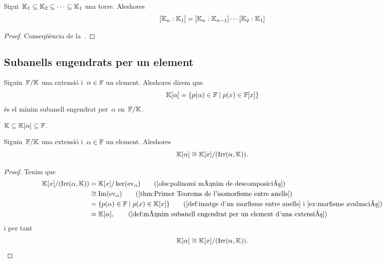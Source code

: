 \documentclass[../../main.tex]{subfiles}
\begin{document}
    \begin{corollary}
        \label{cor:fórmula de les torres}
        Sigui~\(\mathbb{K}_{1}\subseteq\mathbb{K}_{2}\subseteq\dots\subseteq\mathbb{K}_{1}\) una torre.
        Aleshores
        \[
            [\mathbb{K}_{n}:\mathbb{K}_{1}]=[\mathbb{K}_{n}:\mathbb{K}_{n-1}]\cdots[\mathbb{K}_{2}:\mathbb{K}_{1}]
        \]
    \end{corollary}
    \begin{proof}
        Conseqüència de la~.
    \end{proof}
\subsection{Subanells engendrats per un element}
    \begin{definition}
        \label{def:mínim subanell engendrat per un element d'una extensió}
        Siguin~\(\mathbb{F}/\mathbb{K}\) una extensió i~\(\alpha\in\mathbb{F}\) un element.
        Aleshores direm que
        \[
            \mathbb{K}[\alpha]=\{p(\alpha)\in\mathbb{F}\mid p(x)\in\mathbb{F}[x]\}
        \]
        és el mínim subanell engendrat per~\(\alpha\) en~\(\mathbb{F}/\mathbb{K}\).
    \end{definition}
    \begin{observation}
    \label{obs:l'anell engendrat per alpha està entre l'extensió}
        \(\mathbb{K}\subseteq\mathbb{K}[\alpha]\subseteq\mathbb{F}\).
    \end{observation}
    \begin{proposition}
        \label{prop:el mínim subanell engendrat per un element és l'anell de polinomis quocient l'irreductible de l'element}
        Siguin~\(\mathbb{F}/\mathbb{K}\) una extensió i~\(\alpha\in\mathbb{F}\) un element.
        Aleshores
        \[
            \mathbb{K}[\alpha]\cong\mathbb{K}[x]/(\operatorname{Irr}(\alpha,\mathbb{K})).
        \]
    \end{proposition}
    \begin{proof}
        Tenim que
        \begin{align*}
            \KK[x]/(\Irr(\alpha,\KK))&=\KK[x]/\ker(\ev_{\alpha}) \tag{\ref{obs:polinomi mínim de descomposició}}\\
            &\cong\Ima(\ev_{\alpha}) \tag{\ref{thm:Primer Teorema de l'isomorfisme entre anells}}\\
            &=\{p(\alpha)\in\FF\mid p(x)\in\KK[x]\} \tag{\ref{def:imatge d'un morfisme entre anells} i \ref{ex:morfisme avaluació}}\\
            &= \KK[\alpha], \tag{\ref{def:mínim subanell engendrat per un element d'una extensió}}
        \end{align*}
        i per tant
        \[
            \mathbb{K}[\alpha]\cong\mathbb{K}[x]/(\operatorname{Irr}(\alpha,\mathbb{K})).\qedhere
        \]
    \end{proof}
\end{document}
